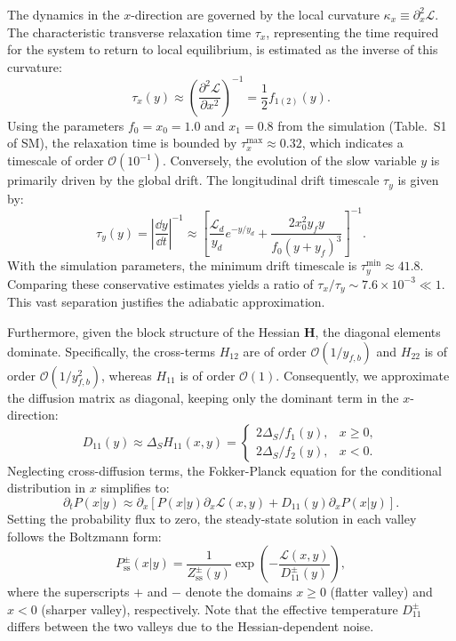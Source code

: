 \documentclass[aps,prx,reprint,superscriptaddress,longbibliography,nofootinbib,floatfix]{revtex4-2}
\begin{document}
The dynamics in the $x$-direction are governed by the local curvature $\kappa_x \equiv \partial_x^2 \mathcal{L}$. The characteristic transverse relaxation time $\tau_x$, representing the time required for the system to return to local equilibrium, is estimated as the inverse of this curvature:
\begin{equation}
    \tau_x(y) \approx \left( \frac{\partial^2 \mathcal{L}}{\partial x^2} \right)^{-1} = \frac{1}{2} f_{1(2)}(y).
\end{equation}
Using the parameters $f_0=x_0=1.0$ and $x_1=0.8$ from the simulation (Table.~S1 of SM), the relaxation time is bounded by $\tau_x^{\mathrm{max}} \approx 0.32$, which indicates a timescale of order $\mathcal{O}(10^{-1})$. Conversely, the evolution of the slow variable $y$ is primarily driven by the global drift. The longitudinal drift timescale $\tau_y$ is given by:
\begin{equation}
    \tau_y(y) = \left| \frac{\dd y}{\dd t} \right|^{-1}\approx \left[ \frac{\mathcal{L}_d}{y_d} e^{-y/y_d} +\frac{2x_0^2 y_f y}{f_0(y+y_f)^3} \right]^{-1}.
\end{equation}
With the simulation parameters, the minimum drift timescale is $\tau_y^{\mathrm{min}} \approx 41.8$. Comparing these conservative estimates yields a ratio of $\tau_x / \tau_y \sim 7.6 \times 10^{-3} \ll 1$. This vast separation justifies the adiabatic approximation.

Furthermore, given the block structure of the Hessian $\mathbf{H}$, the diagonal elements dominate. Specifically, the cross-terms $H_{12}$ are of order $\mathcal{O}(1/y_{f,b})$ and $H_{22}$ is of order $\mathcal{O}(1/y_{f,b}^2)$, whereas $H_{11}$ is of order $\mathcal{O}(1)$. Consequently, we approximate the diffusion matrix as diagonal, keeping only the dominant term in the $x$-direction:
\begin{equation}
    D_{11}(y) \approx \Delta_S H_{11}(x,y) = 
    \begin{cases}
        {2\Delta_S}/{f_1(y)}, & x \geq 0, \\
        {2\Delta_S}/{f_2(y)}, & x < 0.
    \end{cases}
\end{equation}
Neglecting cross-diffusion terms, the Fokker-Planck equation for the conditional distribution in $x$ simplifies to:
\begin{equation}
    \partial_t P(x|y) \approx \partial_x \left[ P(x|y) \partial_x \mathcal{L}(x,y) + D_{11}(y) \partial_x P(x|y) \right].
\end{equation}
Setting the probability flux to zero, the steady-state solution in each valley follows the Boltzmann form:
\begin{equation}
    P_{\mathrm{ss}}^{\pm}(x|y) = \frac{1}{Z_{\mathrm{ss}}^{\pm}(y)} \exp\left( -\frac{\mathcal{L}(x,y)}{D_{11}^{\pm}(y)} \right),
\end{equation}
where the superscripts $+$ and $-$ denote the domains $x \ge 0$ (flatter valley) and $x < 0$ (sharper valley), respectively. Note that the effective temperature $D_{11}^{\pm}$ differs between the two valleys due to the Hessian-dependent noise.
\end{document}
